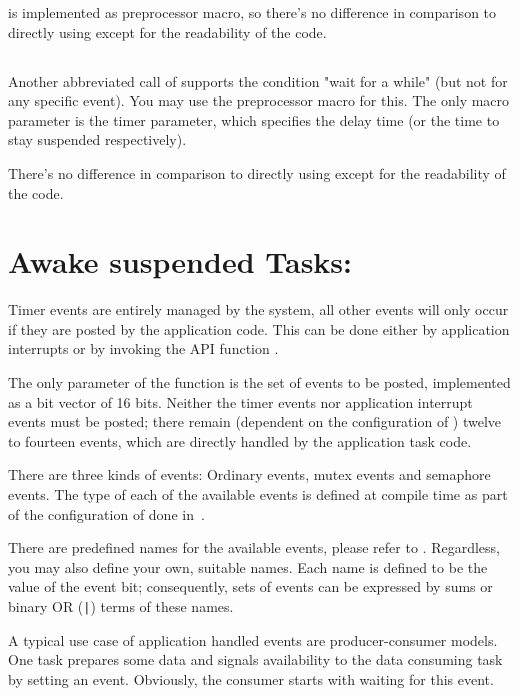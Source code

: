  is implemented as preprocessor macro, so
there's no difference in comparison to directly using
 except for the readability of the code.


\subsection{}

Another abbreviated call of  supports the
condition "wait for a while" (but not for any specific event). You may use
the preprocessor macro  for this. The only macro
parameter is the timer parameter, which specifies the delay time (or the
time to stay suspended respectively).

There's no difference in comparison to directly using
 except for the readability of the code.


\section{Awake suspended Tasks: }

Timer events are entirely managed by the system, all other events will
only occur if they are posted by the application code. This can be done
either by application interrupts or by invoking the API function
.

The only parameter of the function is the set of events to be posted,
implemented as a bit vector of 16 bits. Neither the timer events nor
application interrupt events must be posted; there remain (dependent on
the configuration of \rtos{}) twelve to fourteen events, which are
directly handled by the application task code.

There are three kinds of events: Ordinary events, mutex events and
semaphore events. The type of each of the available events is defined at
compile time as part of the configuration of \rtos{} done in~.

There are predefined names for the available events, please refer to
. Regardless, you may also define your own, suitable names. Each
name is defined to be the value of the event bit; consequently, sets of
events can be expressed by sums or binary OR (\verb+|+) terms of these
names.

A typical use case of application handled events are producer-consumer
models. One task prepares some data and signals availability to the data
consuming task by setting an event. Obviously, the consumer starts with
waiting for this event.

